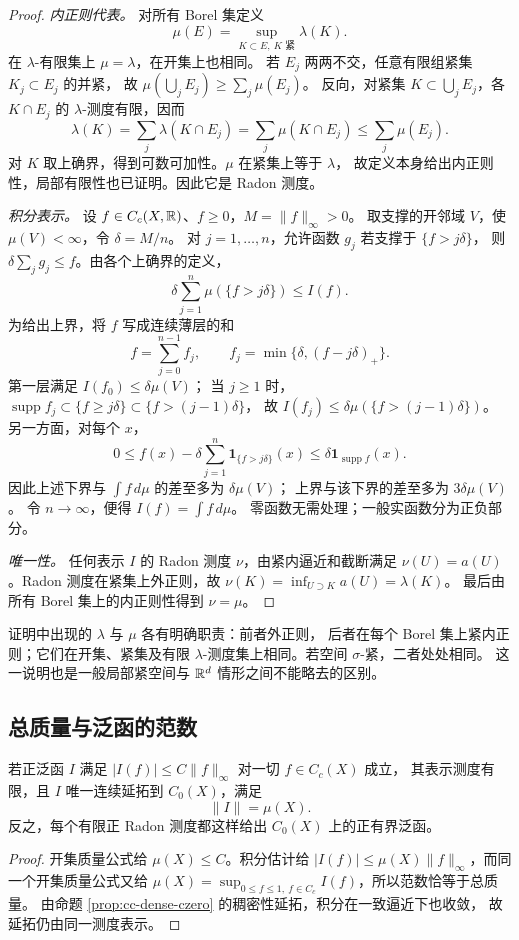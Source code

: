 \begin{proof}
\emph{内正则代表。}
对所有 Borel 集定义
\[
 \mu(E)=\sup_{K\subset E,\ K\text{ 紧}}\lambda(K).
\]
在 \(\lambda\)-有限集上 \(\mu=\lambda\)，在开集上也相同。
若 \(E_j\) 两两不交，任意有限组紧集 \(K_j\subset E_j\) 的并紧，
故 \(\mu(\bigcup_j E_j)\ge\sum_j\mu(E_j)\)。
反向，对紧集 \(K\subset\bigcup_j E_j\)，各 \(K\cap E_j\) 的
\(\lambda\)-测度有限，因而
\[
 \lambda(K)=\sum_j\lambda(K\cap E_j)
           =\sum_j\mu(K\cap E_j)\le\sum_j\mu(E_j).
\]
对 \(K\) 取上确界，得到可数可加性。\(\mu\) 在紧集上等于 \(\lambda\)，
故定义本身给出内正则性，局部有限性也已证明。因此它是 Radon 测度。

\emph{积分表示。}
设 \(f\in C_c(X,\mathbb{R})\)、\(f\ge0\)，\(M=\|f\|_\infty>0\)。
取支撑的开邻域 \(V\)，使 \(\mu(V)<\infty\)，令 \(\delta=M/n\)。
对 \(j=1,\ldots,n\)，允许函数 \(g_j\) 若支撑于 \(\{f>j\delta\}\)，
则 \(\delta\sum_jg_j\le f\)。由各个上确界的定义，
\[
 \delta\sum_{j=1}^{n}\mu(\{f>j\delta\})\le I(f).
\]
为给出上界，将 \(f\) 写成连续薄层的和
\[
 f=\sum_{j=0}^{n-1}f_j,\qquad
 f_j=\min\{\delta,(f-j\delta)_+\}.
\]
第一层满足 \(I(f_0)\le\delta\mu(V)\)；
当 \(j\ge1\) 时，
\(\operatorname{supp}f_j\subset\{f\ge j\delta\}\subset\{f>(j-1)\delta\}\)，
故 \(I(f_j)\le\delta\mu(\{f>(j-1)\delta\})\)。
另一方面，对每个 \(x\)，
\[
 0\le f(x)-\delta\sum_{j=1}^n\mathbf1_{\{f>j\delta\}}(x)
 \le\delta\mathbf1_{\operatorname{supp}f}(x).
\]
因此上述下界与 \(\int f\,d\mu\) 的差至多为 \(\delta\mu(V)\)；
上界与该下界的差至多为 \(3\delta\mu(V)\)。
令 \(n\to\infty\)，便得 \(I(f)=\int f\,d\mu\)。
零函数无需处理；一般实函数分为正负部分。

\emph{唯一性。}
任何表示 \(I\) 的 Radon 测度 \(\nu\)，由紧内逼近和截断满足
\(\nu(U)=a(U)\)。Radon 测度在紧集上外正则，故
\(\nu(K)=\inf_{U\supset K}a(U)=\lambda(K)\)。
最后由所有 Borel 集上的内正则性得到 \(\nu=\mu\)。
\end{proof}

证明中出现的 \(\lambda\) 与 \(\mu\) 各有明确职责：前者外正则，
后者在每个 Borel 集上紧内正则；它们在开集、紧集及有限
\(\lambda\)-测度集上相同。若空间 \(\sigma\)-紧，二者处处相同。
这一说明也是一般局部紧空间与 \(\mathbb{R}^d\) 情形之间不能略去的区别。

\subsection{总质量与泛函的范数}

\begin{corollary}\label{cor:positive-czero-representation}
若正泛函 \(I\) 满足
\(|I(f)|\le C\|f\|_\infty\) 对一切 \(f\in C_c(X)\) 成立，
其表示测度有限，且 \(I\) 唯一连续延拓到 \(C_0(X)\)，满足
\[
 \|I\|=\mu(X).
\]
反之，每个有限正 Radon 测度都这样给出 \(C_0(X)\) 上的正有界泛函。
\end{corollary}
\begin{proof}
开集质量公式给 \(\mu(X)\le C\)。积分估计给
\(|I(f)|\le\mu(X)\|f\|_\infty\)，而同一个开集质量公式又给
\(\mu(X)=\sup_{0\le f\le1,\ f\in C_c}I(f)\)，所以范数恰等于总质量。
由命题 \ref{prop:cc-dense-czero} 的稠密性延拓，积分在一致逼近下也收敛，
故延拓仍由同一测度表示。
\end{proof}

